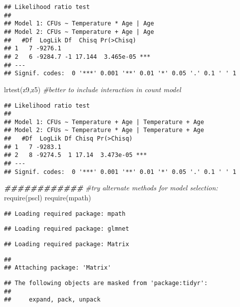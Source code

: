 \documentclass[
]{article}
\newenvironment{Shaded}{\begin{snugshade}}{\end{snugshade}}
\newcommand{\CommentTok}[1]{\textcolor[rgb]{0.56,0.35,0.01}{\textit{#1}}}
\newcommand{\DocumentationTok}[1]{\textcolor[rgb]{0.56,0.35,0.01}{\textbf{\textit{#1}}}}
\newcommand{\FunctionTok}[1]{\textcolor[rgb]{0.00,0.00,0.00}{#1}}
\newcommand{\NormalTok}[1]{#1}
\begin{document}
\begin{verbatim}
## Likelihood ratio test
## 
## Model 1: CFUs ~ Temperature * Age | Age
## Model 2: CFUs ~ Temperature + Age | Age
##   #Df  LogLik Df  Chisq Pr(>Chisq)    
## 1   7 -9276.1                         
## 2   6 -9284.7 -1 17.144  3.465e-05 ***
## ---
## Signif. codes:  0 '***' 0.001 '**' 0.01 '*' 0.05 '.' 0.1 ' ' 1
\end{verbatim}

\begin{Shaded}
\begin{Highlighting}[]
\FunctionTok{lrtest}\NormalTok{(z9,z5) }\CommentTok{\#better to include interaction in count model}
\end{Highlighting}
\end{Shaded}

\begin{verbatim}
## Likelihood ratio test
## 
## Model 1: CFUs ~ Temperature + Age | Temperature + Age
## Model 2: CFUs ~ Temperature * Age | Temperature + Age
##   #Df  LogLik Df Chisq Pr(>Chisq)    
## 1   7 -9283.1                        
## 2   8 -9274.5  1 17.14  3.473e-05 ***
## ---
## Signif. codes:  0 '***' 0.001 '**' 0.01 '*' 0.05 '.' 0.1 ' ' 1
\end{verbatim}

\begin{Shaded}
\begin{Highlighting}[]
\DocumentationTok{\#\#\#\#\#\#\#\#\#\#\#\#}
\CommentTok{\#try alternate methods for model selection:}
\FunctionTok{require}\NormalTok{(pscl)}
\FunctionTok{require}\NormalTok{(mpath)}
\end{Highlighting}
\end{Shaded}

\begin{verbatim}
## Loading required package: mpath
\end{verbatim}

\begin{verbatim}
## Loading required package: glmnet
\end{verbatim}

\begin{verbatim}
## Loading required package: Matrix
\end{verbatim}

\begin{verbatim}
## 
## Attaching package: 'Matrix'
\end{verbatim}

\begin{verbatim}
## The following objects are masked from 'package:tidyr':
## 
##     expand, pack, unpack
\end{verbatim}
\end{document}
